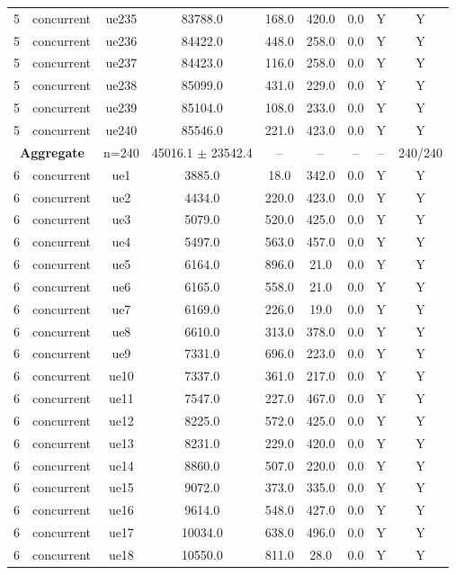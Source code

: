 \begin{table}[ht]
\begin{tabular}{|c|c|c|c|c|c|c|c|c|}
5 & concurrent & ue235 & 83788.0 & 168.0 & 420.0 & 0.0 & Y & Y \\
5 & concurrent & ue236 & 84422.0 & 448.0 & 258.0 & 0.0 & Y & Y \\
5 & concurrent & ue237 & 84423.0 & 116.0 & 258.0 & 0.0 & Y & Y \\
5 & concurrent & ue238 & 85099.0 & 431.0 & 229.0 & 0.0 & Y & Y \\
5 & concurrent & ue239 & 85104.0 & 108.0 & 233.0 & 0.0 & Y & Y \\
5 & concurrent & ue240 & 85546.0 & 221.0 & 423.0 & 0.0 & Y & Y \\
\multicolumn{2}{|c|}{\textbf{Aggregate}} & n=240 & 45016.1 $\pm$ 23542.4 & -- & -- & -- & -- & 240/240 \\
\hline
6 & concurrent & ue1 & 3885.0 & 18.0 & 342.0 & 0.0 & Y & Y \\
6 & concurrent & ue2 & 4434.0 & 220.0 & 423.0 & 0.0 & Y & Y \\
6 & concurrent & ue3 & 5079.0 & 520.0 & 425.0 & 0.0 & Y & Y \\
6 & concurrent & ue4 & 5497.0 & 563.0 & 457.0 & 0.0 & Y & Y \\
6 & concurrent & ue5 & 6164.0 & 896.0 & 21.0 & 0.0 & Y & Y \\
6 & concurrent & ue6 & 6165.0 & 558.0 & 21.0 & 0.0 & Y & Y \\
6 & concurrent & ue7 & 6169.0 & 226.0 & 19.0 & 0.0 & Y & Y \\
6 & concurrent & ue8 & 6610.0 & 313.0 & 378.0 & 0.0 & Y & Y \\
6 & concurrent & ue9 & 7331.0 & 696.0 & 223.0 & 0.0 & Y & Y \\
6 & concurrent & ue10 & 7337.0 & 361.0 & 217.0 & 0.0 & Y & Y \\
6 & concurrent & ue11 & 7547.0 & 227.0 & 467.0 & 0.0 & Y & Y \\
6 & concurrent & ue12 & 8225.0 & 572.0 & 425.0 & 0.0 & Y & Y \\
6 & concurrent & ue13 & 8231.0 & 229.0 & 420.0 & 0.0 & Y & Y \\
6 & concurrent & ue14 & 8860.0 & 507.0 & 220.0 & 0.0 & Y & Y \\
6 & concurrent & ue15 & 9072.0 & 373.0 & 335.0 & 0.0 & Y & Y \\
6 & concurrent & ue16 & 9614.0 & 548.0 & 427.0 & 0.0 & Y & Y \\
6 & concurrent & ue17 & 10034.0 & 638.0 & 496.0 & 0.0 & Y & Y \\
6 & concurrent & ue18 & 10550.0 & 811.0 & 28.0 & 0.0 & Y & Y \\

\end{tabular}
\end{table}
